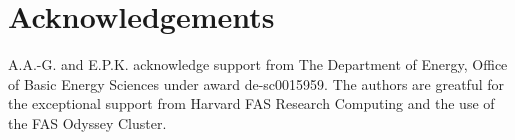 \section{Acknowledgements}
A.A.-G. and E.P.K. acknowledge support from The Department
of Energy, Office of Basic Energy Sciences under
award de-sc0015959. The
authors are greatful for the exceptional support from
Harvard FAS Research Computing and the use of the
FAS Odyssey Cluster.